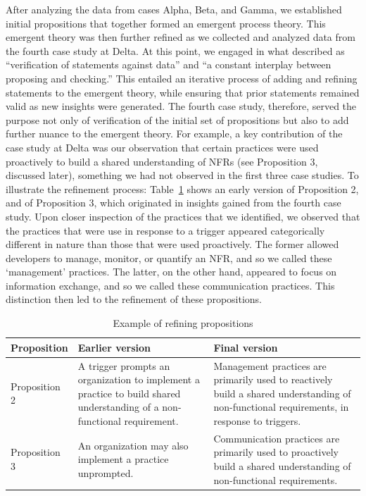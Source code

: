 \documentclass[smallextended]{svjour3}
\begin{document}
After analyzing the data from cases Alpha, Beta, and Gamma, we established initial propositions that together formed an emergent process theory. This emergent theory was then further refined as we collected and analyzed data from the fourth case study at Delta. At this point, we engaged in what \citet[p. 108-111]{strauss1990basics} described as ``verification of statements against data'' and ``a constant interplay between proposing and checking.''
This entailed an iterative process of adding and refining statements to the emergent theory, while ensuring that prior statements remained valid as new insights were generated. 
The fourth case study, therefore, served the purpose not only of verification of the initial set of propositions but also to add further nuance to the emergent theory. For example, a key contribution of the case study at Delta was our observation that certain practices were used proactively to build a shared understanding of NFRs (see Proposition 3, discussed later), something we had not observed in the first three case studies.
To illustrate the refinement process: Table~\ref{tab:proprefinement} shows an early version of Proposition 2, and of Proposition 3, which originated in insights gained from the fourth case study.
Upon closer inspection of the practices that we identified, we observed that the practices that were use in response to a trigger appeared categorically different in nature than those that were used proactively. The former allowed developers to manage, monitor, or quantify an NFR, and so we called these  `management' practices. The latter, on the other hand, appeared to focus on information exchange, and so we called these communication practices. This distinction then led to the refinement of these propositions.


\begin{table}[!t]
\caption{Example of refining propositions}
    \label{tab:proprefinement}
    \centering
    \begin{tabular}{p{2cm}p{4cm}p{5.3cm}}
\toprule
Proposition & Earlier version & Final version \\
\midrule 
Proposition 2 & A trigger prompts an organization to implement a practice to build shared understanding of a non-functional requirement.     &   Management practices are primarily used to reactively build a shared understanding of non-functional requirements, in response to triggers.\\
\addlinespace
Proposition 3 & An organization may also implement a practice unprompted.  & Communication practices are primarily used to proactively build a shared understanding of non-functional requirements. \\
\bottomrule 
\end{tabular}    
\end{table}
\end{document}
